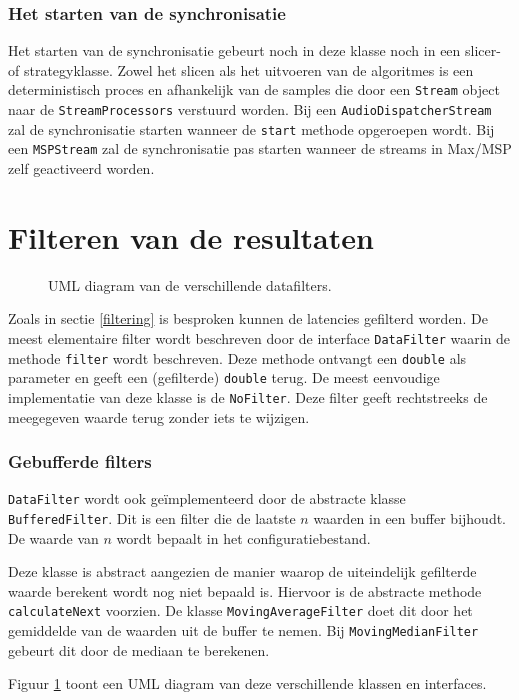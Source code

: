 \subsubsection{Het starten van de synchronisatie}

Het starten van de synchronisatie gebeurt noch in deze klasse noch in een slicer- of \mbox{strategyklasse}. Zowel het slicen als het uitvoeren van de algoritmes is een deterministisch proces en afhankelijk van de samples die door een \texttt{Stream} object naar de \texttt{StreamProcessors} verstuurd worden. Bij een \texttt{AudioDispatcherStream} zal de synchronisatie starten wanneer de \texttt{start} methode opgeroepen wordt. Bij een \texttt{MSPStream} zal de synchronisatie pas starten wanneer de streams in Max/MSP zelf geactiveerd worden.

\section*{Filteren van de resultaten}
\label{filterontwerp}

\begin{figure}[h!]
	\captionsetup{width=0.7\textwidth}
	\caption{UML diagram van de verschillende datafilters.}
	\begin{center}
		\advance\parskip0.3cm
		
	\end{center}
	\label{filterUML}
\end{figure}

Zoals in sectie \ref{filtering} is besproken kunnen de latencies gefilterd worden. De meest elementaire filter wordt beschreven door de interface \texttt{DataFilter} waarin de methode \texttt{filter} wordt beschreven. Deze methode ontvangt een \texttt{double} als parameter en geeft een (gefilterde) \texttt{double} terug. De meest eenvoudige implementatie van deze klasse is de \texttt{NoFilter}. Deze filter geeft rechtstreeks de meegegeven waarde terug zonder iets te wijzigen.

\subsubsection{Gebufferde filters}

\texttt{DataFilter} wordt ook geïmplementeerd door de abstracte klasse \texttt{BufferedFilter}. Dit is een filter die de laatste $ n $ waarden in een buffer bijhoudt. De waarde van $ n $ wordt bepaalt in het configuratiebestand. 

Deze klasse is abstract aangezien de manier waarop de uiteindelijk gefilterde waarde \mbox{berekent} wordt nog niet bepaald is. Hiervoor is de abstracte methode \texttt{calculateNext} voorzien. De klasse \texttt{MovingAverageFilter} doet dit door het gemiddelde van de waarden uit de buffer te nemen. Bij \texttt{MovingMedianFilter} gebeurt dit door de mediaan te berekenen.

Figuur \ref{filterUML} toont een UML diagram van deze verschillende klassen en interfaces.
